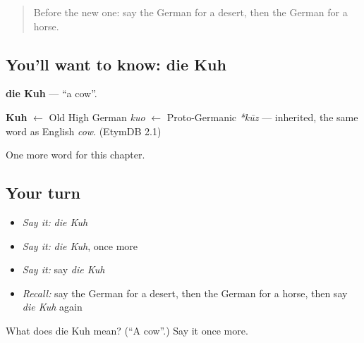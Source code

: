 \label{lesson:GE-C85-kuh}



\begin{quote}
Before the new one: say the German for a desert, then the German for a horse.
\end{quote}

\subsection*{You'll want to know: die Kuh}
\textbf{die Kuh} — \textquotedblleft{}a cow\textquotedblright{}.

\begin{cousinweb}
\textbf{Kuh} $\leftarrow$ Old High German \emph{kuo} $\leftarrow$ Proto-Germanic \emph{*kūz} — inherited, the same word as English \emph{cow}. (EtymDB 2.1)
\end{cousinweb}

\begin{grammarlens}[title={What you've built}]
One more word for this chapter.
\end{grammarlens}

\subsection*{Your turn}
\begin{itemize}
\raggedright
  \item \emph{Say it:} \emph{die Kuh}
  \item \emph{Say it:} \emph{die Kuh}, once more
  \item \emph{Say it:} say \emph{die Kuh}
  \item \emph{Recall:} say the German for a desert, then the German for a horse, then say \emph{die Kuh} again
\end{itemize}

\begin{tcolorbox}[breakable,colback=teal!4,colframe=teal!35!black,title={Before you move on}]
What does die Kuh mean? (\textquotedblleft{}A cow\textquotedblright{}.) Say it once more.
\end{tcolorbox}
